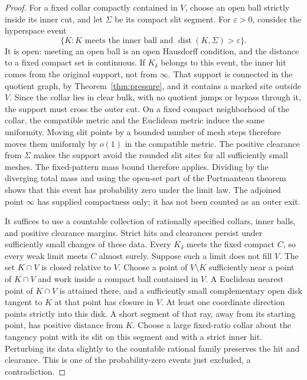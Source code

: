 \begin{proof}
For a fixed collar compactly contained in $V$, choose an open ball
strictly inside its inner cut, and let $\Sigma$ be its compact slit
segment.  For $\varepsilon>0$, consider the hyperspace event
\[
 \{K:K\text{ meets the inner ball and }
          \operatorname{dist}(K,\Sigma)>\varepsilon\}.
\]
It is open: meeting an open ball is an open Hausdorff condition, and
the distance to a fixed compact set is continuous.  If $K_\delta$
belongs to this event, the inner hit comes from the original support,
not from $\infty$.  That support is connected in the quotient graph,
by Theorem~\ref{thm:pressure}, and it contains a marked site outside
$V$.  Since the collar lies in clear bulk, with no quotient jumps
or bypass through it, the support must cross the outer cut.
On a fixed compact neighborhood of the collar, the compatible metric
and the Euclidean metric induce the same uniformity.  Moving slit
points by a bounded number of mesh steps therefore moves them uniformly
by $o(1)$ in the compatible metric.  The positive clearance from
$\Sigma$ makes the support avoid the rounded slit sites for all
sufficiently small meshes.  The fixed-pattern mass bound therefore
applies.  Dividing by the diverging total mass and using the open-set
part of the Portmanteau theorem shows that this event has probability
zero under the limit law.  The adjoined point $\infty$ has supplied
compactness only; it has not been counted as an outer exit.

It suffices to use a countable collection of rationally specified
collars, inner balls, and positive clearance margins.  Strict hits
and clearances persist under sufficiently small changes of these data.
Every $K_\delta$ meets the fixed compact $C$, so every weak limit
meets $C$ almost surely.  Suppose such a limit does not fill $V$.
The set $K\cap V$ is closed relative to $V$.  Choose a point of
$V\setminus K$ sufficiently near a point of $K\cap V$ and work inside
a compact ball contained in $V$.  A Euclidean nearest point of
$K\cap V$ is attained there, and a sufficiently small complementary
open disk tangent to $K$ at that point has closure in $V$.  At least
one coordinate direction points strictly into this disk.  A short segment of that
ray, away from its starting point, has positive distance from $K$.
Choose a large fixed-ratio collar about the tangency point with its
slit on this segment and with a strict inner hit.  Perturbing its data
slightly to the countable rational family preserves the hit and
clearance.  This is one of the probability-zero events just excluded,
a contradiction.
\end{proof}

